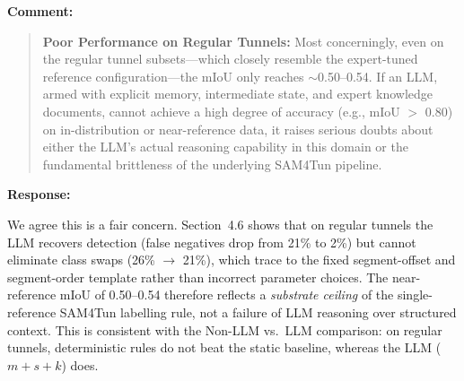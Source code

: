 \documentclass[11pt,a4paper]{article}
\newenvironment{commentblock}{%
  \par\smallskip\noindent\textbf{Comment:}\par
  \begin{quote}\itshape\color{black}
}{%
  \end{quote}\smallskip
}
\newenvironment{responseblock}{%
  \par\smallskip\noindent\textbf{Response:}\par
  \begingroup\color{responsegreen}
}{%
  \endgroup\smallskip
}
\begin{document}
\begin{commentblock}
\textbf{Poor Performance on Regular Tunnels:} Most concerningly, even on the regular tunnel subsets---which closely resemble the expert-tuned reference configuration---the mIoU only reaches $\sim$0.50--0.54. If an LLM, armed with explicit memory, intermediate state, and expert knowledge documents, cannot achieve a high degree of accuracy (e.g., mIoU $>$ 0.80) on in-distribution or near-reference data, it raises serious doubts about either the LLM's actual reasoning capability in this domain or the fundamental brittleness of the underlying SAM4Tun pipeline.
\end{commentblock}
\begin{responseblock}
We agree this is a fair concern. Section~4.6 shows that on regular tunnels the LLM recovers detection (false negatives drop from 21\% to 2\%) but cannot eliminate class swaps (26\% $\rightarrow$ 21\%), which trace to the fixed segment-offset and segment-order template rather than incorrect parameter choices. The near-reference mIoU of 0.50--0.54 therefore reflects a \emph{substrate ceiling} of the single-reference SAM4Tun labelling rule, not a failure of LLM reasoning over structured context. This is consistent with the Non-LLM vs.\ LLM comparison: on regular tunnels, deterministic rules do not beat the static baseline, whereas the LLM ($m+s+k$) does.
\end{responseblock}
\end{document}
